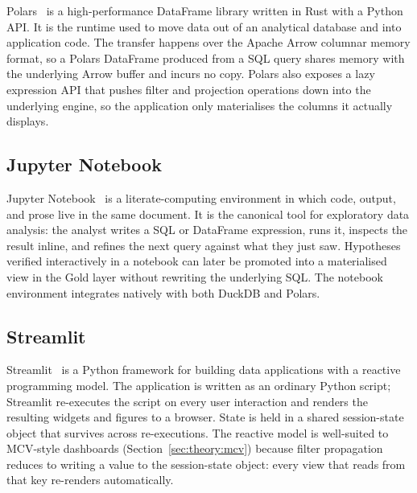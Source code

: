 \noindent
Polars~\cite{polars} is a high-performance DataFrame library
written in Rust with a Python API. It is the runtime used to
move data out of an analytical database and into application
code. The transfer happens over the Apache Arrow columnar
memory format, so a Polars DataFrame produced from a SQL query
shares memory with the underlying Arrow buffer and incurs no
copy. Polars also exposes a lazy expression API that pushes
filter and projection operations down into the underlying
engine, so the application only materialises the columns it
actually displays.

\subsection{Jupyter Notebook}
\label{sec:theory:jupyter}


\noindent
Jupyter Notebook~\cite{jupyter} is a literate-computing
environment in which code, output, and prose live in the same
document. It is the canonical tool for exploratory data
analysis: the analyst writes a SQL or DataFrame expression,
runs it, inspects the result inline, and refines the next
query against what they just saw. Hypotheses verified
interactively in a notebook can later be promoted into a
materialised view in the Gold layer without rewriting the
underlying SQL. The notebook environment integrates natively
with both DuckDB and Polars.

\subsection{Streamlit}
\label{sec:theory:streamlit}


\noindent
Streamlit~\cite{streamlit} is a Python framework for building
data applications with a reactive programming model. The
application is written as an ordinary Python script;
Streamlit re-executes the script on every user interaction and
renders the resulting widgets and figures to a browser. State
is held in a shared session-state object that survives across
re-executions. The reactive model is well-suited to MCV-style
dashboards (Section~\ref{sec:theory:mcv}) because filter
propagation reduces to writing a value to the session-state
object: every view that reads from that key re-renders
automatically.

